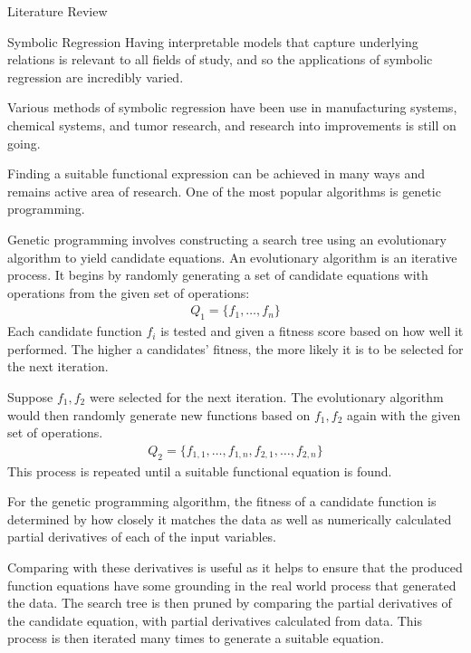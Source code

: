 \documentclass[12pt]{amsbook}
\begin{document}
\begin{chapter}{Literature Review}
\begin{section}{Symbolic Regression}
        Having interpretable models that capture underlying relations is relevant to all fields of study, and so the applications of symbolic regression are incredibly varied. 

        Various methods of symbolic regression have been use in manufacturing systems, chemical systems, and tumor research\cite{can2011comparison,keith2021combining,yoshihara2013inferring}, and research into improvements is still on going.

        Finding a suitable functional expression can be achieved in many ways and remains active area of research. One of the most popular algorithms is genetic programming\cite{schmidt2009distilling}. 
        
        Genetic programming involves constructing a search tree using an evolutionary algorithm to yield candidate equations. An evolutionary algorithm is an iterative process. It begins by randomly generating a set of candidate equations with operations from the given set of operations:
        \begin{align}
            Q_1=\{f_1,\dots,f_n\}
        \end{align}
        Each candidate function $f_i$ is tested and given a fitness score based on how well it performed. The higher a candidates' fitness, the more likely it is to be selected for the next iteration.

        Suppose $f_1,f_2$ were selected for the next iteration. The evolutionary algorithm would then randomly generate new functions based on $f_1,f_2$ again with the given set of operations.
        \begin{align}
            Q_2=\{f_{1,1},\dots,f_{1,n}, f_{2,1},\dots,f_{2,n}\}
        \end{align}
        This process is repeated until a suitable functional equation is found. 

        For the genetic programming algorithm, the fitness of a candidate function is determined by how closely it matches the data as well as numerically calculated partial derivatives of each of the input variables. 
        
        Comparing with these derivatives is useful as it helps to ensure that the produced function equations have some grounding in the real world process that generated the data. The search tree is then pruned by comparing the partial derivatives of the candidate equation, with partial derivatives calculated from data. This process is then iterated many times to generate a suitable equation.


\end{section}
\end{chapter}
\end{document}
